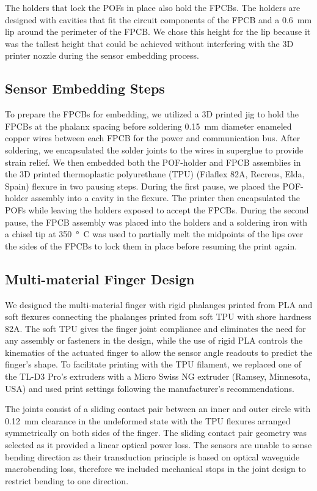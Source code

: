 The holders that lock the POFs in place also hold the FPCBs. The holders are designed with cavities that fit the circuit components of the FPCB and a \qty{0.6}{\mm} lip around the perimeter of the FPCB. We chose this height for the lip because it was the tallest height that could be achieved without interfering with the 3D printer nozzle during the sensor embedding process.

\subsection{Sensor Embedding Steps}
To prepare the FPCBs for embedding, we utilized a 3D printed jig to hold the FPCBs at the phalanx spacing before soldering \qty{0.15}{\mm} diameter enameled copper wires between each FPCB for the power and communication bus. After soldering, we encapsulated the solder joints to the wires in superglue to provide strain relief. We then embedded both the POF-holder and FPCB assemblies in the 3D printed thermoplastic polyurethane (TPU) (Filaflex 82A, Recreus, Elda, Spain) flexure in two pausing steps. During the first pause, we placed the POF-holder assembly into a cavity in the flexure. The printer then encapsulated the POFs while leaving the holders exposed to accept the FPCBs. During the second pause, the FPCB assembly was placed into the holders and a soldering iron with a chisel tip at \qty{350}{\degree C} was used to partially melt the midpoints of the lips over the sides of the FPCBs to lock them in place before resuming the print again. 

\subsection{Multi-material Finger Design}\label{subsec:finger_design}
We designed the multi-material finger with rigid phalanges printed from PLA and soft flexures connecting the phalanges printed from soft TPU with shore hardness 82A. The soft TPU gives the finger joint compliance and eliminates the need for any assembly or fasteners in the design, while the use of rigid PLA controls the kinematics of the actuated finger to allow the sensor angle readouts to predict the finger's shape. To facilitate printing with the TPU filament, we replaced one of the TL-D3 Pro's extruders with a Micro Swiss NG extruder (Ramsey, Minnesota, USA) and used print settings following the manufacturer's recommendations. 

The joints consist of a sliding contact pair between an inner and outer circle with \qty{0.12}{\mm} clearance in the undeformed state with the TPU flexures arranged symmetrically on both sides of the finger. The sliding contact pair geometry was selected as it provided a linear optical power loss. The sensors are unable to sense bending direction as their transduction principle is based on optical waveguide macrobending loss, therefore we included mechanical stops in the joint design to restrict bending to one direction. 

